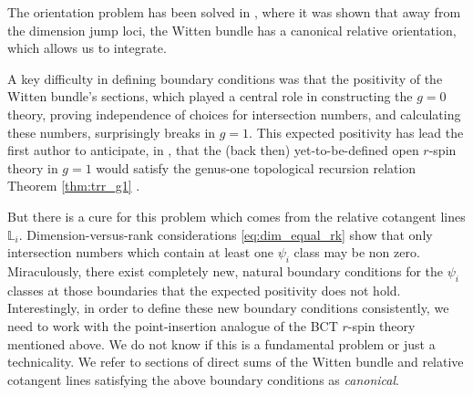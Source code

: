 \documentclass[11pt]{amsart}
\theoremstyle{definition}
\theoremstyle{remark}
\newcommand{\CL}{{\mathbb{L}}}
\newcommand{\<}{\left<}
\renewcommand{\>}{\right>}
\numberwithin{equation}{section}
\begin{document}
The orientation problem has been solved in \cite[\S 3]{TZ1}, where it was shown that away from the dimension %
jump loci, the %
Witten bundle has a canonical relative orientation, which allows us to integrate.

A key difficulty in defining boundary conditions was that the positivity of the Witten bundle's sections, which played a central role in constructing the $g=0$ theory, proving independence of choices for intersection numbers, and calculating these numbers, surprisingly breaks in $g=1.$
This expected positivity has lead %
the first author to %
anticipate, in \cite{BCT3}, that the (back then) yet-to-be-defined open $r$-spin theory in $g=1$ would satisfy the genus-one topological recursion relation %
Theorem \ref{thm:trr_g1} .

But %
there is a cure for %
this problem which %
comes from the relative cotangent lines %
$\CL_i.$ Dimension-versus-rank considerations %
\eqref{eq:dim_equal_rk} show that only intersection numbers which contain at least one $\psi_i$ class may %
be non zero. Miraculously, %
there exist completely %
new, natural boundary %
conditions for the $\psi_i$ classes at those boundaries that the expected positivity does not hold. Interestingly, in order to define these new boundary %
conditions consistently, we %
need to work with the point-insertion analogue of the BCT $r$-spin theory mentioned above. We do not know if this is a fundamental problem or just a technicality. We refer to sections of direct sums of the Witten bundle and relative cotangent lines satisfying the above boundary conditions as \emph{canonical}.
\end{document}
